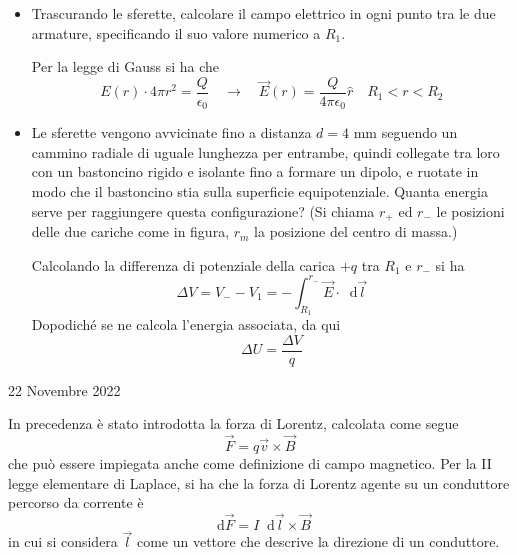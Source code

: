 \documentclass[a4paper]{extarticle}
\newcommand\dif{\mathop{}\!\mathrm{d}}
\begin{document}
\begin{itemize}
  \item Trascurando le sferette, calcolare il campo elettrico in ogni punto tra le due armature, specificando il suo valore numerico a $R_1$.
  
  \vspace{2em}
  \noindent
  Per la legge di Gauss si ha che
  \[E(r) \cdot 4 \pi r^2 = \dfrac{Q}{\epsilon_0} \hspace{1em} \rightarrow \hspace{1em} \vec{E}(r) = \dfrac{Q}{4 \pi \epsilon_0} \hat r \hspace{1em} R_1<r<R_2\]

  \item Le sferette vengono avvicinate fino a distanza $d=4$ mm seguendo un cammino radiale di uguale lunghezza per entrambe, quindi collegate tra loro con un bastoncino rigido e isolante fino a formare un dipolo, e ruotate in modo che il bastoncino stia sulla superficie equipotenziale. Quanta energia serve per raggiungere questa configurazione? (Si chiama $r_+$ ed $r_-$ le posizioni delle due cariche come in figura, $r_m$ la posizione del centro di massa.)

  \vspace{2em}
  \noindent
  Calcolando la differenza di potenziale della carica $+q$ tra $R_1$ e $r_-$ si ha
  \[\Delta V = V_- - V_1 = -\int_{R_1}^{r_-} \vec E \cdot \dif \vec l\]
  Dopodiché se ne calcola l'energia associata, da qui
  \[\Delta U = \dfrac{\Delta V}{q}\]
\end{itemize}

\newpage
\noindent
\begin{center}
  22 Novembre 2022
\end{center}
In precedenza è stato introdotta la forza di Lorentz, calcolata come segue
\[\vec F = q \vec v \times \vec B\]
che può essere impiegata anche come definizione di campo magnetico. Per la II legge elementare di Laplace, si ha che la forza di Lorentz agente su un conduttore percorso da corrente è
\[\dif \vec F = I \dif \vec l \times \vec B\]
in cui si considera $\vec l$ come un vettore che descrive la direzione di un conduttore. 

\vspace{1em}
\end{document}

